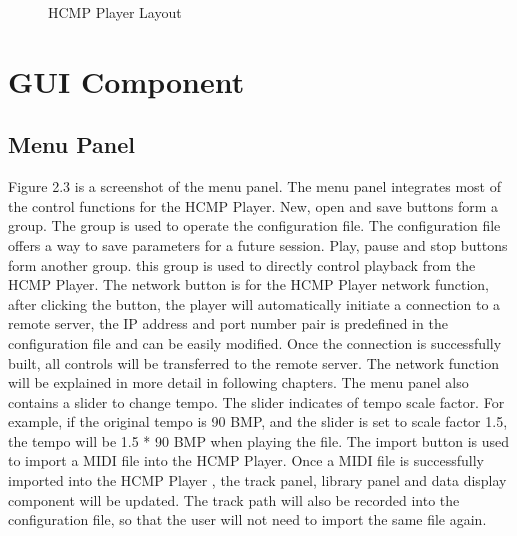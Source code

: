 \begin{figure}[H]
\caption{HCMP Player Layout}
\end{figure}

\section{GUI Component}

\subsection{Menu Panel}

Figure 2.3 is a screenshot of the menu panel. The menu panel integrates most of the control 
functions for the HCMP Player. New, open and save buttons form a group. The group is used to 
operate the configuration file. The configuration file offers a way to save parameters for a
future session. Play, pause and stop buttons form another group. 
this group is used to directly control playback from the HCMP Player.
The network button is for the HCMP Player  
network function, after clicking the button, the player will automatically 
initiate a connection to a remote server, the IP address and port number pair is 
predefined in the configuration file and can be easily modified. Once the connection is 
successfully built, all controls will be transferred to the remote server. 
The network function will be explained in more detail in following
chapters. The menu panel also contains a slider to change 
tempo. The slider indicates of tempo scale factor. For example, 
if the original tempo is 90 BMP, and the slider is set to scale factor 1.5, 
the tempo will be 1.5 * 90 
BMP when playing the file. The import button is used to import a MIDI file 
into the HCMP Player. Once a MIDI file is successfully imported into the HCMP Player  
, the track panel, library panel and data display component will be updated.
The track path will also be recorded into the configuration file, so that the user 
will not need to import the same file again.

